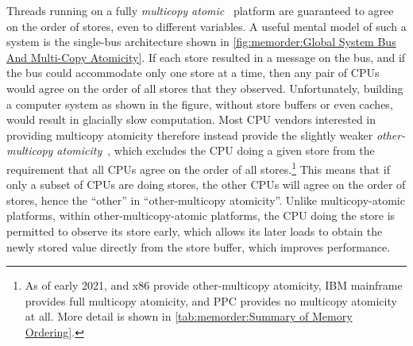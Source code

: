 Threads running on a fully
\emph{multicopy atomic}~\cite{Stone:1995:SP:623262.623912}
platform are guaranteed
to agree on the order of stores, even to different variables.
A useful mental model of such a system is the single-bus architecture
shown in
\cref{fig:memorder:Global System Bus And Multi-Copy Atomicity}.
If each store resulted in a message on the bus, and if the bus could
accommodate only one store at a time, then any pair of CPUs would
agree on the order of all stores that they observed.
Unfortunately, building a computer system as shown in the figure, without
store buffers or even caches, would result in glacially slow computation.
Most CPU vendors interested in providing multicopy atomicity therefore
instead provide the slightly weaker
\emph{other-multicopy atomicity}~\cite[Section B2.3]{ARMv8A:2017},
which excludes the CPU doing a given store from the requirement that all
CPUs agree on the order of all stores.\footnote{
	As of early 2021,  and x86 provide other-multicopy atomicity,
	IBM mainframe provides full multicopy atomicity, and PPC
	provides no multicopy atomicity at all.
	More detail is shown in
	\cref{tab:memorder:Summary of Memory Ordering}.}
This means that if only a subset of CPUs are doing stores, the
other CPUs will agree on the order of stores, hence the ``other''
in ``other-multicopy atomicity''.
Unlike multicopy-atomic platforms, within other-multicopy-atomic platforms,
the CPU doing the store is permitted to observe its
store early, which allows its later loads to obtain the newly stored
value directly from the store buffer, which improves performance.

